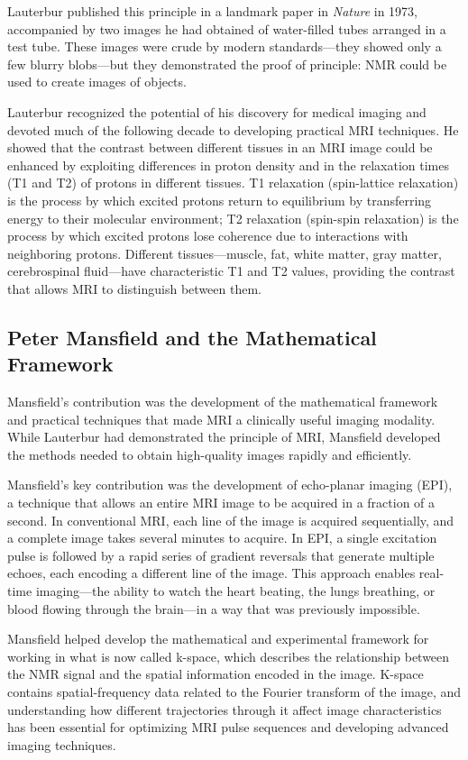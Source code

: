 Lauterbur published this principle in a landmark paper in \textit{Nature} in 1973, accompanied by two images he had obtained of water-filled tubes arranged in a test tube. These images were crude by modern standards---they showed only a few blurry blobs---but they demonstrated the proof of principle: NMR could be used to create images of objects.

Lauterbur recognized the potential of his discovery for medical imaging and devoted much of the following decade to developing practical MRI techniques. He showed that the contrast between different tissues in an MRI image could be enhanced by exploiting differences in proton density and in the relaxation times (T1 and T2) of protons in different tissues. T1 relaxation (spin-lattice relaxation) is the process by which excited protons return to equilibrium by transferring energy to their molecular environment; T2 relaxation (spin-spin relaxation) is the process by which excited protons lose coherence due to interactions with neighboring protons. Different tissues---muscle, fat, white matter, gray matter, cerebrospinal fluid---have characteristic T1 and T2 values, providing the contrast that allows MRI to distinguish between them.

\subsection{Peter Mansfield and the Mathematical Framework}

Mansfield's contribution was the development of the mathematical framework and practical techniques that made MRI a clinically useful imaging modality. While Lauterbur had demonstrated the principle of MRI, Mansfield developed the methods needed to obtain high-quality images rapidly and efficiently.

Mansfield's key contribution was the development of echo-planar imaging (EPI), a technique that allows an entire MRI image to be acquired in a fraction of a second. In conventional MRI, each line of the image is acquired sequentially, and a complete image takes several minutes to acquire. In EPI, a single excitation pulse is followed by a rapid series of gradient reversals that generate multiple echoes, each encoding a different line of the image. This approach enables real-time imaging---the ability to watch the heart beating, the lungs breathing, or blood flowing through the brain---in a way that was previously impossible.

Mansfield helped develop the mathematical and experimental framework for working in what is now called k-space, which describes the relationship between the NMR signal and the spatial information encoded in the image. K-space contains spatial-frequency data related to the Fourier transform of the image, and understanding how different trajectories through it affect image characteristics has been essential for optimizing MRI pulse sequences and developing advanced imaging techniques.

